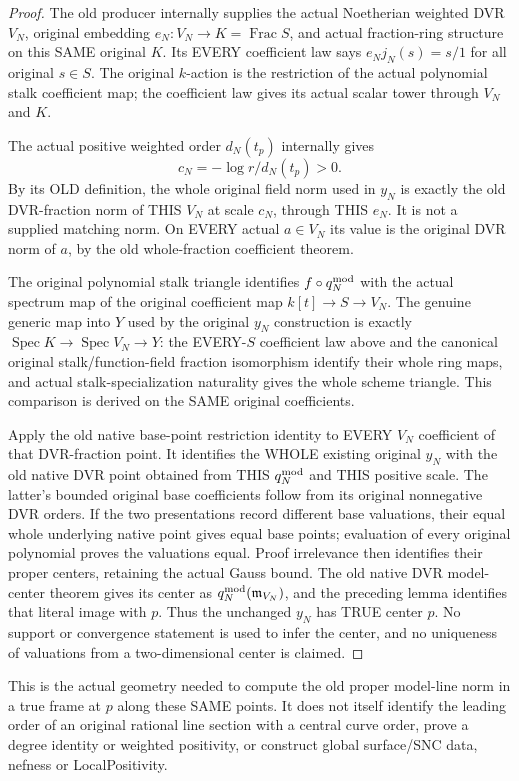 \begin{proof}
The old producer internally supplies the actual Noetherian weighted DVR
$V_N$, original embedding $e_N:V_N\to K=\operatorname{Frac}S$, and
actual fraction-ring structure on this SAME original $K$. Its EVERY
coefficient law says $e_Nj_N(s)=s/1$ for all original $s\in S$.
The original $k$-action is the restriction of the actual polynomial
stalk coefficient map; the coefficient law gives its actual scalar
tower through $V_N$ and $K$.

The actual positive weighted order $d_N(t_p)$ internally gives
\[
 c_N=-\log r/d_N(t_p)>0.
\]
By its OLD definition, the whole original
field norm used in $y_N$ is exactly the old DVR-fraction norm of THIS
$V_N$ at scale $c_N$, through THIS $e_N$. It is not a supplied matching
norm. On EVERY actual $a\in V_N$ its value is the original DVR norm of
$a$, by the old whole-fraction coefficient theorem.

The original polynomial stalk triangle identifies
$f\circ q_N^{\rm mod}$ with the actual spectrum map of the original
coefficient map $k[t]\to S\to V_N$. The genuine generic map into $Y$
used by the original $y_N$ construction is exactly
$\operatorname{Spec}K\to\operatorname{Spec}V_N\to Y$:
the EVERY-$S$ coefficient law above and the canonical original
stalk/function-field fraction isomorphism identify their whole ring
maps, and actual stalk-specialization naturality gives the whole scheme
triangle. This comparison is derived on the SAME original coefficients.

Apply the old native base-point restriction identity to EVERY $V_N$
coefficient of that DVR-fraction point. It identifies the WHOLE existing
original $y_N$ with the old native DVR point obtained from THIS
$q_N^{\rm mod}$ and THIS positive scale. The latter's bounded original
base coefficients follow from its original nonnegative DVR orders.
If the two presentations record different base valuations, their equal
whole underlying native point gives equal base points; evaluation of
every original polynomial proves the valuations equal. Proof irrelevance
then identifies their proper centers, retaining the actual Gauss bound.
The old native DVR model-center theorem gives its center as
$q_N^{\rm mod}(\mathfrak m_{V_N})$, and the preceding lemma identifies
that literal image with $p$. Thus the unchanged $y_N$ has TRUE center $p$.
No support or convergence statement is used to infer the center, and no
uniqueness of valuations from a two-dimensional center is claimed.
\end{proof}

This is the actual geometry needed to compute the old proper model-line
norm in a true frame at $p$ along these SAME points. It does not itself
identify the leading order of an original rational line section with a
central curve order, prove a degree identity or weighted positivity, or
construct global surface/SNC data, nefness or LocalPositivity.
